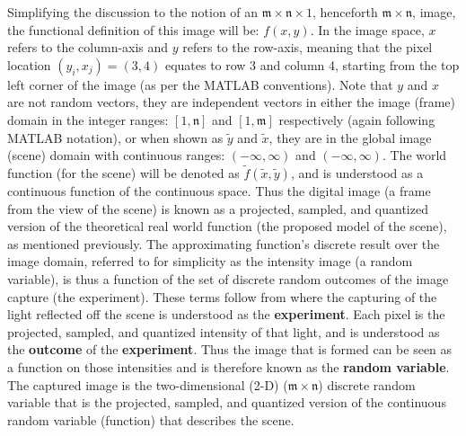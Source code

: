 Simplifying the discussion to the notion of an $\mathfrak{m} \times \mathfrak{n} \times 1$, henceforth $\mathfrak{m} \times \mathfrak{n}$, image, the functional definition of this image will be: $f(x,y)$. In the image space, $x$ refers to the column-axis and $y$ refers to the row-axis, meaning that the pixel location $(y_{i},x_{j})=(3,4)$ equates to row 3 and column 4, starting from the top left corner of the image (as per the MATLAB\textsuperscript{\textregistered} conventions). Note that $y$ and $x$ are not random vectors, they are independent vectors in either the image (frame) domain in the integer ranges: $[1,\mathfrak{n}]$ and $[1,\mathfrak{m}]$ respectively (again following MATLAB\textsuperscript{\textregistered} notation), or when shown as $\tilde{y}$ and $\tilde{x}$, they are in the global image (scene) domain with continuous ranges: $(-\infty,\infty)$ and $(-\infty,\infty)$. The world function (for the scene) will be denoted as $\tilde{f}(\tilde{x},\tilde{y})$, and is understood as a continuous function of the continuous space. Thus the digital image (a frame from the view of the scene) is known as a projected, sampled, and quantized version of the theoretical real world function (the proposed model of the scene), as mentioned previously. The approximating function's discrete result over the image domain, referred to for simplicity as the intensity image (a random variable), is thus a function of the set of discrete random outcomes of the image capture (the experiment). These terms follow from \cite{Papoulis2002} where the capturing of the light reflected off the scene is understood as the \textbf{experiment}. Each pixel is the projected, sampled, and quantized intensity of that light, and is understood as the \textbf{outcome} of the \textbf{experiment}. Thus the image that is formed can be seen as a function on those intensities and is therefore known as the \textbf{random variable}. The captured image is the two-dimensional (2-D) ($\mathfrak{m}\times\mathfrak{n}$) discrete random variable that is the projected, sampled, and quantized version of the continuous random variable (function) that describes the scene.

